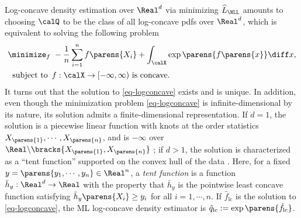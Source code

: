 \documentclass[12pt]{article}
\theoremstyle{definition}
\theoremstyle{theorem}
\theoremstyle{remark}
\begin{document}
Log-concave density estimation over $\Real^d$ via minimizing $\widehat{L}_{\NLL}$ amounts to choosing $\calQ$ to be the class of all log-concave pdfs over $\Real^d$, which is equivalent to solving the following problem 
\begin{equation}\label{eq-logconcave}
	\begin{aligned}
		\minimize_f & \ - \frac{1}{n} \sum_{i=1}^n f \parens{X_i} + \int_{\calX} \exp \parens{f \parens{x}} \diff x, \\ 
		\text{ subject to } & \, f: \calX \to [-\infty, \infty) \text{ is concave.}
	\end{aligned}
\end{equation}
It turns out that the solution to \eqref{eq-logconcave} exists and is unique. In addition, even though the minimization problem \eqref{eq-logconcave} is infinite-dimensional by its nature, its solution admits a finite-dimensional representation. If $d = 1$, the solution is a piecewise linear function with knots at the order statistics $X_{\parens{1}}, \cdots, X_{\parens{n}}$, and is $-\infty$ over $\Real \backslash \bracks{X_{\parens{1}}, X_{\parens{n}}}$ \parencites{Walther2002-tw, Pal2007-ai, Dumbgen2009-br}; if $d > 1$, the solution is characterized as a ``tent function'' supported on the convex hull of the data \parencites{Cule2010-lc}. Here, for a fixed $y = \parens{y_1, \cdots, y_n} \in \Real^n$, a \textit{tent function} is a function $\bar{h}_y: \Real^d \to \Real$ with the property that $\bar{h}_y$ is the pointwise least concave function satisfying $\bar{h}_y \parens{X_i} \ge y_i$ for all $i = 1, \cdots, n$. If $\hat{f}_{\mathrm{lc}}$ is the solution to \eqref{eq-logconcave}, the ML log-concave density estimator is $\hat{q}_{\mathrm{lc}} := \exp \parens{\hat{f}_{\mathrm{lc}}}$. 
\end{document}
